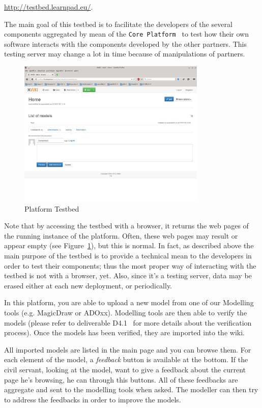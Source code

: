 \documentclass{learnpad}
\begin{document}
\url{http://testbed.learnpad.eu/}.

The main goal of this testbed is to facilitate the developers of the several 
components aggregated by mean of the \texttt{\learnpad Core 
Platform}~\cite{learnpad:D2.1} to test how their own software interacts with 
the components developed by the other partners. This testing server may change a 
lot in time because of manipulations of partners.  

\begin{figure}[h!]
 \centering
 \includegraphics[width=0.8\textwidth]{./Figures/testbed.jpg}
 \caption{\learnpad Platform Testbed}
 \label{fig:testbed}
\end{figure}

Note that by accessing the testbed with a browser, it returns the 
web pages of the running instance of the platform. Often, these web pages may 
result or appear empty (see Figure~\ref{fig:testbed}), but this is normal.
In fact, as described above the main purpose of the testbed is to provide
a technical mean to the developers in order to test their components; thus the 
most proper way of interacting with the testbed is not with a browser, yet.
Also, since it's a testing server, data may be erased either at each new
deployment, or periodically.

In this platform, you are able to upload a new model from one of our Modelling
tools (e.g. MagicDraw or ADOxx).  Modelling tools are then able to verify the 
models (please refer to deliverable D4.1~\cite{learnpad:D4.1} for more details 
about the verification process). Once the models has been verified, they are 
imported into the wiki.

All imported models are listed in the main page and you can browse them.  For
each element of the model, a \textit{feedback} button is available at the 
bottom. If the civil servant, looking at the model, want to give a feedback 
about the current page he's browsing, he can through this buttons.  All of 
these feedbacks are aggregate and sent to the modelling tools when asked.  The 
modeller can then try to address the feedbacks in order to improve the models.
\end{document}
